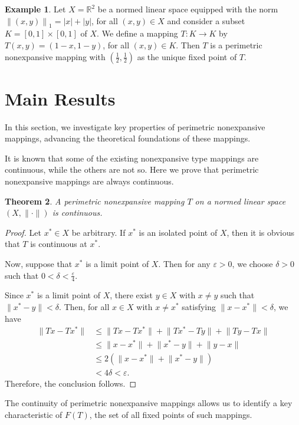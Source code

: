 \documentclass[11pt,reqno]{amsart}
\newtheorem{theorem}{Theorem}[section]
\theoremstyle{definition}
\newtheorem{example}[theorem]{Example}
\newtheorem{Open Prob}[theorem]{Open Problem}
\theoremstyle{remark}
\numberwithin{equation}{section}
\begin{document}
\begin{example}\label{E24}
Let $X= \mathbb{R}^2$ be a normed linear space equipped with the norm ${\lVert (x,y) \rVert}_1 = |x| + |y|$, for all $(x,y) \in X$ and consider a subset $K=[0,1] \times [0,1]$ of $X$. We define a mapping $T:K \to K$ by $T(x,y)= (1-x,1-y)$, for all $(x,y) \in K$. Then $T$ is a perimetric nonexpansive mapping with $(\frac{1}{2}, \frac{1}{2})$ as the unique fixed point of $T$.
\end{example}

\section{Main Results}
In this section, we investigate key properties of perimetric nonexpansive mappings, advancing the theoretical foundations of these mappings.

It is known that some of the existing nonexpansive type mappings are continuous, while the others are not so. Here we prove that perimetric nonexpansive mappings are always continuous.


\begin{theorem}\label{T31}
A perimetric nonexpansive mapping $T$ on a normed linear space $(X,\|\cdot\|)$ is continuous.
\end{theorem}

\begin{proof}
Let $x^*\in X$ be arbitrary. If $x^*$ is an isolated point of $X$, then it is obvious that $T$ is continuous at $x^*$. 

Now, suppose that $x^*$ is a limit point of $X$. Then for any $\varepsilon>0$, we choose $ \delta>0 $ such that $0<\delta<\frac{\varepsilon}{4}$. 

Since $x^*$ is a limit point of $X$, there exist $y \in X$ with $ x \neq y$ such that $\lVert x^* -y \rVert < \delta$. Then, for all $x \in X$ with $x \neq x^*$ satisfying $\lVert x-x^* \rVert < \delta$, we have
\begin{align*}
\lVert Tx-Tx^* \rVert &\le \lVert Tx-Tx^* \rVert + \lVert Tx^*-Ty \rVert + \lVert Ty-Tx \rVert\\
&\le \lVert x-x^* \rVert + \lVert x^*-y \rVert + \lVert y-x \rVert\\
&\le 2( \lVert x-x^* \rVert + \lVert x^*-y \rVert)\\
& < 4 \delta < \varepsilon.
\end{align*}
Therefore, the conclusion follows.
\end{proof}
The continuity of perimetric nonexpansive mappings allows us to identify a key characteristic of $F(T)$, the set of all fixed points of such mappings.
\end{document}
